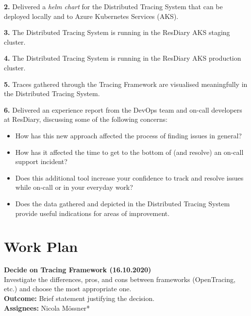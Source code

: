 \documentclass[11pt]{article}
\begin{document}
\textbf{2.} Delivered a \textit{helm chart}\cite{helmcharts} for the Distributed Tracing System that can be deployed locally and to Azure Kubernetes Services (AKS).

\textbf{3.} The Distributed Tracing System is running in the ResDiary AKS staging cluster.

\textbf{4.} The Distributed Tracing System is running in the ResDiary AKS production cluster.

\textbf{5.} Traces gathered through the Tracing Framework are visualised meaningfully in the Distributed Tracing System.

\textbf{6.} Delivered an experience report from the DevOps team and on-call developers at ResDiary, discussing some of the following concerns:
\begin{itemize}
    \item How has this new approach affected the process of finding issues in general?
    \item How has it affected the time to get to the bottom of (and resolve) an on-call support incident?
    \item Does this additional tool increase your confidence to track and resolve issues while on-call or in your everyday work?
    \item Does the data gathered and depicted in the Distributed Tracing System provide useful indications for areas of improvement.
\end{itemize}

\section{Work Plan}
\label{WorkPlan}


\textbf{Decide on Tracing Framework (16.10.2020)}\\
Investigate the differences, pros, and cons between frameworks (OpenTracing, etc.) and choose the most appropriate one.\\
\textbf{Outcome:} Brief statement justifying the decision.\\
\textbf{Assignees:} Nicola M\"{o}ssner*
\end{document}

